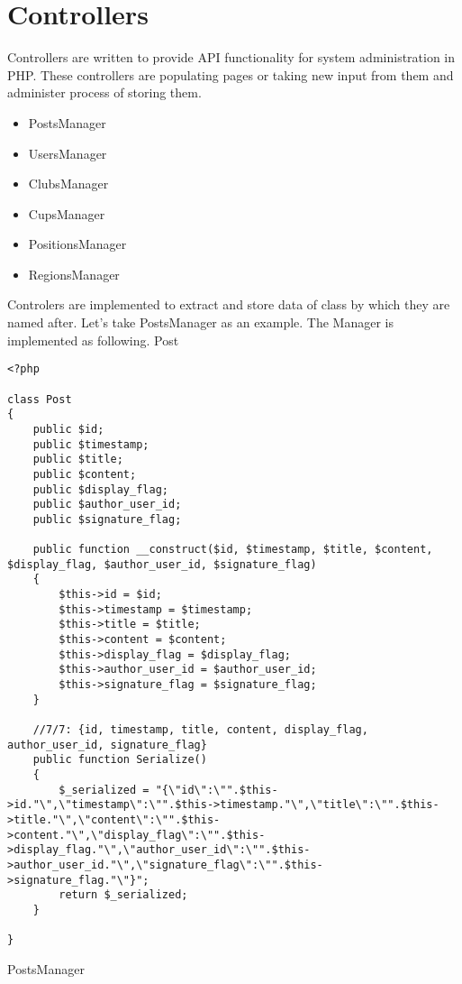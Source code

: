 \section{Controllers}
Controllers are written to provide API functionality for system administration in PHP. These controllers are populating pages or taking new input from them and administer process of storing them.
\begin{itemize}
    \item PostsManager
    \item UsersManager
    \item ClubsManager
    \item CupsManager
    \item PositionsManager
    \item RegionsManager
\end{itemize}
Controlers are implemented to extract and store data of class by which they are named after. Let's take PostsManager as an example. The Manager is implemented as following.  
Post
\begin{lstlisting}
<?php

class Post
{
    public $id;
    public $timestamp;
    public $title;
    public $content;
    public $display_flag;
    public $author_user_id;
	public $signature_flag;

    public function __construct($id, $timestamp, $title, $content, $display_flag, $author_user_id, $signature_flag)
    {
        $this->id = $id;
        $this->timestamp = $timestamp;
        $this->title = $title;
        $this->content = $content;
        $this->display_flag = $display_flag;
        $this->author_user_id = $author_user_id;
        $this->signature_flag = $signature_flag;
    }

	//7/7: {id, timestamp, title, content, display_flag, author_user_id, signature_flag}
	public function Serialize()
	{
		$_serialized = "{\"id\":\"".$this->id."\",\"timestamp\":\"".$this->timestamp."\",\"title\":\"".$this->title."\",\"content\":\"".$this->content."\",\"display_flag\":\"".$this->display_flag."\",\"author_user_id\":\"".$this->author_user_id."\",\"signature_flag\":\"".$this->signature_flag."\"}";
		return $_serialized;
	}

}

\end{lstlisting}
PostsManager  
